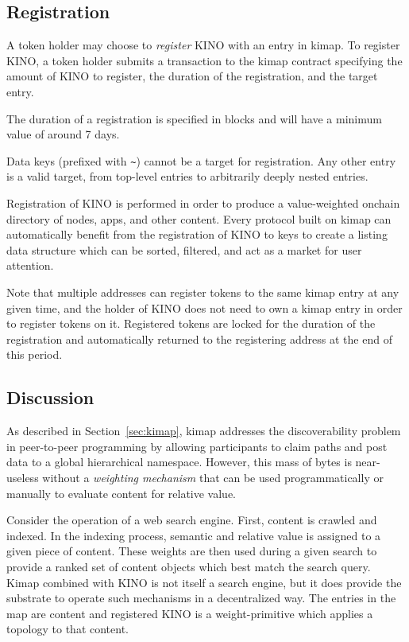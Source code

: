\documentclass[runningheads]{llncs}
\begin{document}
\subsection{Registration}
\label{sec:kinoregister}

A token holder may choose to \textit{register} KINO with an entry in kimap.
To register KINO, a token holder submits a transaction to the kimap contract specifying the amount of KINO to register, the duration of the registration, and the target entry.

The duration of a registration is specified in blocks and will have a minimum value of around 7 days.

Data keys (prefixed with \verb|~|) cannot be a target for registration.
Any other entry is a valid target, from top-level entries to arbitrarily deeply nested entries.

Registration of KINO is performed in order to produce a value-weighted onchain directory of nodes, apps, and other content.
Every protocol built on kimap can automatically benefit from the registration of KINO to keys to create a listing data structure which can be sorted, filtered, and act as a market for user attention.

Note that multiple addresses can register tokens to the same kimap entry at any given time, and the holder of KINO does not need to own a kimap entry in order to register tokens on it.
Registered tokens are locked for the duration of the registration and automatically returned to the registering address at the end of this period.

\subsection{Discussion}
\label{sec:kinodiscussion}

As described in Section~\ref{sec:kimap}, kimap addresses the discoverability problem in peer-to-peer programming by allowing participants to claim paths and post data to a global hierarchical namespace.
However, this mass of bytes is near-useless without a \textit{weighting mechanism} that can be used programmatically or manually to evaluate content for relative value.

Consider the operation of a web search engine.
First, content is crawled and indexed.
In the indexing process, semantic and relative value is assigned to a given piece of content.
These weights are then used during a given search to provide a ranked set of content objects which best match the search query.
Kimap combined with KINO is not itself a search engine, but it does provide the substrate to operate such mechanisms in a decentralized way.
The entries in the map are content and registered KINO is a weight-primitive which applies a topology to that content.
\end{document}
